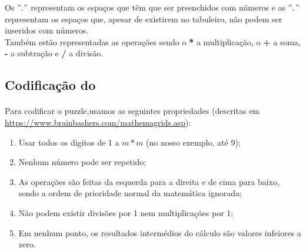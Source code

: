 \documentclass{article}
\begin{document}
Os $"."$ representam os espaços que têm que ser preenchidos com números e as $","$ representam os espaços que, apesar de existirem no tabuleiro, não podem ser inseridos com números. 
\\

Também estão representadas as operações sendo o {\bf{*}} a multiplicação, o  {\bf{+}} a soma, {\bf{-}} a subtração e {\bf{/}} a divisão. 




\subsection{Codificação do {}}
\paragraph{} Para codificar o puzzle,usamos as seguintes propriedades (descritas em {\url{https://www.brainbashers.com/mathemagrids.asp}}):
 \begin{enumerate}
 \item Usar todos os digitos de 1 a $m*m$ (no nosso exemplo, até $9$);
 \item Nenhum número pode ser repetido;
 \item As operações são feitas da esquerda para a direita e de cima para baixo, sendo a ordem de prioridade normal da matemática ignorada;
 \item Não podem existir divisões por 1 nem multiplicações por 1;
\item Em nenhum ponto, os resultados intermédios do cálculo são valores infeiores a zero.
 \end{enumerate}
\end{document}
